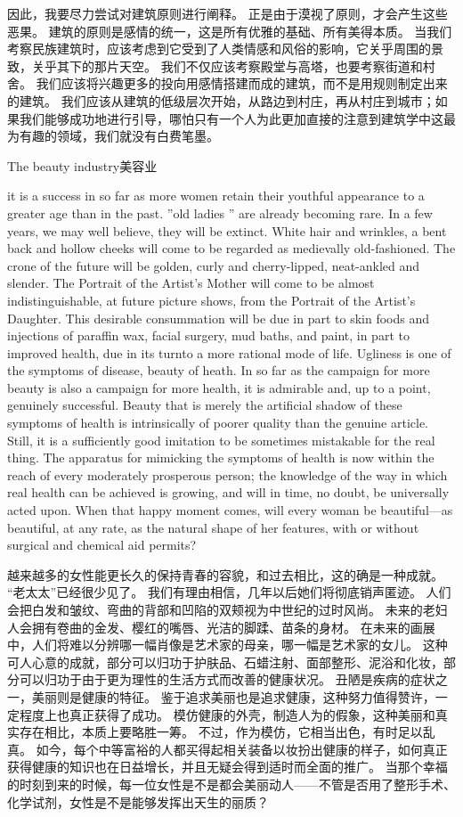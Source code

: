 \documentclass[cs4size, a4paper, 12pt]{article}
\newcounter{numpar}
\newcommand*{\newpar}{\numpar{}}
\begin{document}
	因此，我要尽力尝试对建筑原则进行阐释。 正是由于漠视了原则，才会产生这些恶果。 建筑的原则是感情的统一，这是所有优雅的基础、所有美得本质。 当我们考察民族建筑时，应该考虑到它受到了人类情感和风俗的影响，它关乎周围的景致，关乎其下的那片天空。 我们不仅应该考察殿堂与高塔，也要考察街道和村舍。 我们应该将兴趣更多的投向用感情搭建而成的建筑，而不是用规则制定出来的建筑。 我们应该从建筑的低级层次开始，从路边到村庄，再从村庄到城市；如果我们能够成功地进行引导，哪怕只有一个人为此更加直接的注意到建筑学中这最为有趣的领域，我们就没有白费笔墨。 
	
	\newpar The beauty industry美容业
	
	\newpar it is a success in so far as more women retain their youthful appearance to a greater age than in the past. ''old ladies '' are already becoming rare. In a few years, we may well believe, they will be extinct. White hair and wrinkles, a bent back and hollow cheeks will come to be regarded as medievally old-fashioned. The crone of the future will be golden, curly and cherry-lipped, neat-ankled and slender. The Portrait of the Artist’s Mother will come to be almost indistinguishable, at future picture shows, from the Portrait of the Artist’s Daughter. This desirable consummation will be due in part to skin foods and injections of paraffin wax, facial surgery, mud baths, and paint, in part to improved health, due in its turnto a more rational mode of life. Ugliness is one of the symptoms of disease, beauty of heath. In so far as the campaign for more beauty is also a campaign for more health, it is admirable and, up to a point, genuinely successful. Beauty that is merely the artificial shadow of these symptoms of health is intrinsically of poorer quality than the genuine article. Still, it is a sufficiently good imitation to be sometimes mistakable for the real thing. The apparatus for mimicking the symptoms of health is now within the reach of every moderately prosperous person; the knowledge of the way in which real health can be achieved is growing, and will in time, no doubt, be universally acted upon. When that happy moment comes, will every woman be beautiful—as beautiful, at any rate, as the natural shape of her features, with or without surgical and chemical aid permits?
	
	越来越多的女性能更长久的保持青春的容貌，和过去相比，这的确是一种成就。 ``老太太''已经很少见了。 我们有理由相信，几年以后她们将彻底销声匿迹。 人们会把白发和皱纹、弯曲的背部和凹陷的双颊视为中世纪的过时风尚。 未来的老妇人会拥有卷曲的金发、樱红的嘴唇、光洁的脚蹂、苗条的身材。 在未来的画展中，人们将难以分辨哪一幅肖像是艺术家的母亲，哪一幅是艺术家的女儿。 这种可人心意的成就，部分可以归功于护肤品、石蜡注射、面部整形、泥浴和化妆，部分可以归功于由于更为理性的生活方式而改善的健康状况。 丑陋是疾病的症状之一，美丽则是健康的特征。 鉴于追求美丽也是追求健康，这种努力值得赞许，一定程度上也真正获得了成功。 模仿健康的外壳，制造人为的假象，这种美丽和真实存在相比，本质上要略胜一筹。 不过，作为模仿，它相当出色，有时足以乱真。 如今，每个中等富裕的人都买得起相关装备以妆扮出健康的样子，如何真正获得健康的知识也在日益增长，并且无疑会得到适时而全面的推广。 当那个幸福的时刻到来的时候，每一位女性是不是都会美丽动人——不管是否用了整形手术、化学试剂，女性是不是能够发挥出天生的丽质？
	
\end{document}
